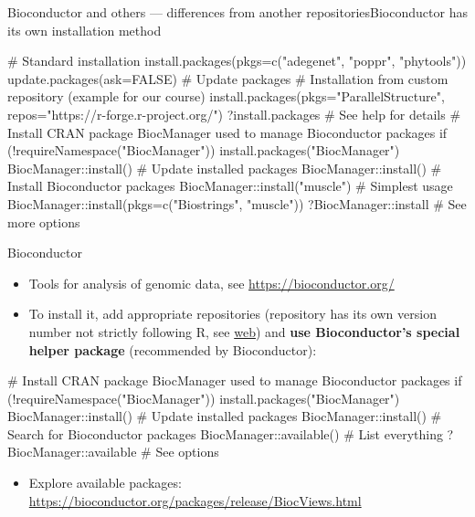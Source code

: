 \documentclass[compress, ucs, xelatex, 11pt, xcolor=svgnames, aspectratio=169,
	hyperref={
		bookmarks=true,
		unicode=true,
		colorlinks=true,
		pdftitle={Molecular data in R},
		plainpages=false,
		pdfauthor={Vojtech Zeisek},
		pdfsubject={Course about phylogeny and evolution in R},
		pdfcreator={XeLaTeX},
		pdfkeywords={R, evolution, phylogeny, molecular data},
		linkcolor=Crimson, %
		anchorcolor=Magenta, %
		citecolor=Magenta, %
		filecolor=Magenta, %
		menucolor=Magenta, %
		urlcolor=DodgerBlue, %
		pdftex},
	url={hyphens, lowtilde} %
	]{beamer}
\begin{document}
\begin{frame}[fragile]{Bioconductor and others --- differences from another repositories}{Bioconductor has its own installation method}
	\label{sources-diff}
	\begin{spluscode}
    # Standard installation
    install.packages(pkgs=c("adegenet", "poppr", "phytools"))
    update.packages(ask=FALSE) # Update packages
    # Installation from custom repository (example for our course)
    install.packages(pkgs="ParallelStructure",
      repos="https://r-forge.r-project.org/")
    ?install.packages # See help for details
    # Install CRAN package BiocManager used to manage Bioconductor packages
    if (!requireNamespace("BiocManager"))
      install.packages("BiocManager")
    BiocManager::install() # Update installed packages
    BiocManager::install()
    # Install Bioconductor packages
    BiocManager::install("muscle") # Simplest usage
    BiocManager::install(pkgs=c("Biostrings", "muscle"))
    ?BiocManager::install # See more options
	\end{spluscode}
\end{frame}

\begin{frame}[fragile]{Bioconductor}
	\label{bioc}
	\begin{itemize}
		\item Tools for analysis of genomic data, see \url{https://bioconductor.org/}
		\item To install it, add appropriate repositories (repository has its own version number not strictly following R, see \href{https://bioconductor.org/install}{web}) and \textbf{use Bioconductor's special helper package} (recommended by Bioconductor):
	\end{itemize}
	\begin{spluscode}
    # Install CRAN package BiocManager used to manage Bioconductor packages
    if (!requireNamespace("BiocManager"))
      install.packages("BiocManager")
    BiocManager::install()
    # Update installed packages
    BiocManager::install()
    # Search for Bioconductor packages
    BiocManager::available() # List everything
    ?BiocManager::available # See options
	\end{spluscode}
	\begin{itemize}
		\item Explore available packages: \url{https://bioconductor.org/packages/release/BiocViews.html}
	\end{itemize}
\end{frame}
\end{document}
